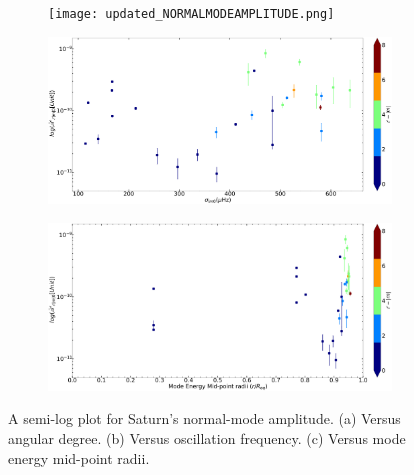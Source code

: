 \documentclass{article}
\begin{document}

\begin{figure}[htbp]
    \centering
    \begin{subfigure}[b]{0.5\linewidth}
        \centering
        \texttt{[image: updated\_NORMALMODEAMPLITUDE.png]}
        \caption{}
        \label{fig:amplitude_vs_degree}
    \end{subfigure}
    \hspace{0.5cm}
    \begin{subfigure}[b]{0.5\linewidth}
        \centering
        \includegraphics[width=\linewidth]{amplitude_PLUS_frequency.png}
        \caption{}
        \label{fig:amplitude_vs_frequency}
    \end{subfigure}
    \hspace{0.5cm}
    \begin{subfigure}[b]{0.5\linewidth}
        \centering
        \includegraphics[width=\linewidth]{mormalmode_RATIOMAIN.png}
        \caption{}
        \label{fig:normal_mode_RATIOPLOT}
    \end{subfigure}
    \caption{A semi-log plot for Saturn's normal-mode amplitude. (a) Versus angular degree. (b) Versus oscillation frequency. (c) Versus mode energy mid-point radii.}
    \label{fig:saturn_normal_mode_amplitude}
\end{figure}
\end{document}
